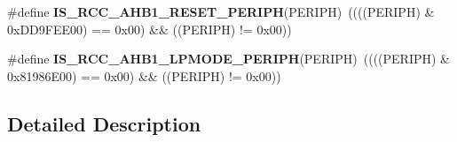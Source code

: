 \begin{DoxyCompactItemize}
\item 
\mbox{\label{group___r_c_c___a_h_b1___peripherals_gaa9369bfafdf69d7398ae04711bc097d0}} 
\#define {\bfseries I\+S\+\_\+\+R\+C\+C\+\_\+\+A\+H\+B1\+\_\+\+R\+E\+S\+E\+T\+\_\+\+P\+E\+R\+I\+PH}(P\+E\+R\+I\+PH)~((((P\+E\+R\+I\+PH) \& 0x\+D\+D9\+F\+E\+E00) == 0x00) \&\& ((\+P\+E\+R\+I\+P\+H) != 0x00))
\item 
\mbox{\label{group___r_c_c___a_h_b1___peripherals_ga2a192b878ab81e83e804efd5dbd0195b}} 
\#define {\bfseries I\+S\+\_\+\+R\+C\+C\+\_\+\+A\+H\+B1\+\_\+\+L\+P\+M\+O\+D\+E\+\_\+\+P\+E\+R\+I\+PH}(P\+E\+R\+I\+PH)~((((P\+E\+R\+I\+PH) \& 0x81986\+E00) == 0x00) \&\& ((\+P\+E\+R\+I\+P\+H) != 0x00))
\end{DoxyCompactItemize}


\subsection{Detailed Description}
